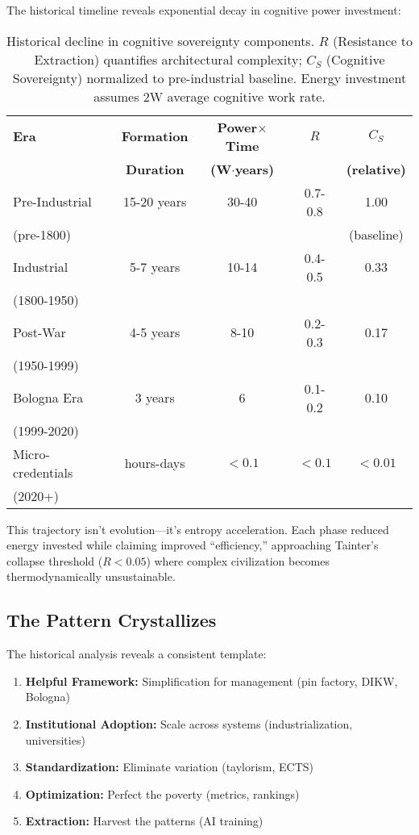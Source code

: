 The historical timeline reveals exponential decay in cognitive power investment:

\begin{table}[h]
\centering
\small
\begin{tabular}{lcccc}
\hline
\textbf{Era} & \textbf{Formation} & \textbf{Power$\times$Time} & \textbf{$R$} & \textbf{$C_S$} \\
& \textbf{Duration} & \textbf{(W$\cdot$years)} & & \textbf{(relative)} \\
\hline
Pre-Industrial & 15-20 years & 30-40 & 0.7-0.8 & 1.00 \\
(pre-1800) & & & & (baseline) \\
\hline
Industrial & 5-7 years & 10-14 & 0.4-0.5 & 0.33 \\
(1800-1950) & & & & \\
\hline
Post-War & 4-5 years & 8-10 & 0.2-0.3 & 0.17 \\
(1950-1999) & & & & \\
\hline
Bologna Era & 3 years & 6 & 0.1-0.2 & 0.10 \\
(1999-2020) & & & & \\
\hline
Micro-credentials & hours-days & $<0.1$ & $<0.1$ & $<0.01$ \\
(2020+) & & & & \\
\hline
\end{tabular}
\caption{Historical decline in cognitive sovereignty components. $R$ (Resistance to Extraction) quantifies architectural complexity; $C_S$ (Cognitive Sovereignty) normalized to pre-industrial baseline. Energy investment assumes 2W average cognitive work rate.}
\label{tab:thermodynamic_gradient}
\end{table}

This trajectory isn't evolution—it's entropy acceleration. Each phase reduced energy invested while claiming improved ``efficiency,'' approaching Tainter's collapse threshold ($R < 0.05$) where complex civilization becomes thermodynamically unsustainable.

\subsection{The Pattern Crystallizes}

The historical analysis reveals a consistent template:

\begin{enumerate}
\item \textbf{Helpful Framework:} Simplification for management (pin factory, DIKW, Bologna)
\item \textbf{Institutional Adoption:} Scale across systems (industrialization, universities)
\item \textbf{Standardization:} Eliminate variation (taylorism, ECTS)
\item \textbf{Optimization:} Perfect the poverty (metrics, rankings)
\item \textbf{Extraction:} Harvest the patterns (AI training)
\end{enumerate}

